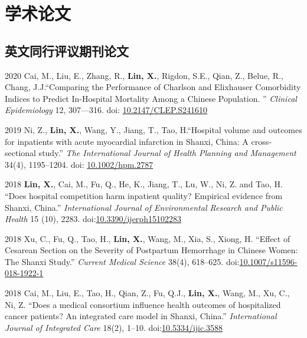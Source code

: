 \documentclass[12pt,letterpaper]{report}
\begin{document}
    \section*{学术论文}

    \subsection*{英文同行评议期刊论文}

    \begin{tablist}
    	
    	\item[2020] \tab Cai, M., Liu, E., Zhang, R., \textbf{Lin, X.},  Rigdon, S.E., Qian, Z., Belue, R., Chang, J.J.\enquote{Comparing the Performance of Charlson and Elixhauser Comorbidity Indices to Predict In-Hospital Mortality Among a Chinese Population. } \textit{Clinical Epidemiology} 12, 307—316. doi: \href{https://doi.org/10.2147/CLEP.S241610}{10.2147/CLEP.S241610}
    	
    	\item[2019] \tab Ni, Z.,  \textbf{Lin, X.}, Wang, Y., Jiang, T., Tao, H.\enquote{Hospital volume and outcomes for inpatients with acute myocardial infarction in Shanxi, China: A cross‐sectional study.} \textit{The International Journal of Health Planning and Management} 34(4), 1195–1204. doi: \href{https://doi.org/10.1002/hpm.2787}{10.1002/hpm.2787}
    	
    	\item[2018] \tab \textbf{Lin, X.}, Cai, M., Fu, Q., He, K., Jiang, T., Lu, W., Ni, Z. and Tao, H. \enquote{Does hospital competition harm inpatient quality? Empirical evidence from Shanxi, China.} \textit{International Journal of Environmental Research and Public Health} 15 (10), 2283. doi:\href{https://doi.org/10.3390/ijerph15102283}{10.3390/ijerph15102283}
    	
    	\item[2018] \tab Xu, C., Fu, Q., Tao, H., \textbf{Lin, X.}, Wang, M., Xia, S., Xiong, H. \enquote{Effect of Cesarean Section on the Severity of Postpartum Hemorrhage in Chinese Women: The Shanxi Study.} \textit{Current Medical Science} 38(4), 618–625. doi:\href{https://doi.org/10.1007/s11596-018-1922-1}{10.1007/s11596-018-1922-1}
    	
    	 \item[2018] \tab Cai, M., Liu, E., Tao, H., Qian, Z., Fu, Q.J., \textbf{Lin, X.}, Wang, M., Xu, C., Ni, Z. \enquote{Does a medical consortium influence health outcomes of hospitalized cancer patients? An integrated care model in Shanxi, China.} \textit{International Journal of Integrated Care}  18(2), 1–10. doi:\href{https://doi.org/10.5334/ijic.3588}{10.5334/ijic.3588}
    	 

\end{tablist}
\end{document}
